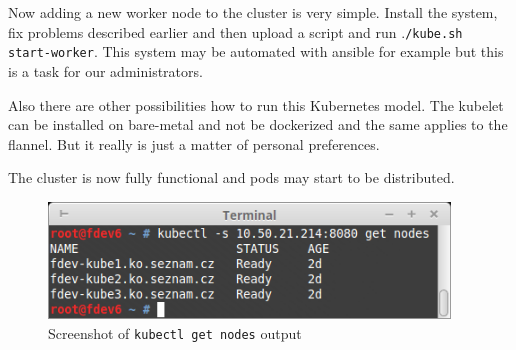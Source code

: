 Now adding a new worker node to the cluster is very simple. Install the system, fix problems described earlier and then upload a script and run .\lstinline{/kube.sh start-worker}. This system may be automated with ansible \cite{ansible} for example but this is a task for our administrators.

Also there are other possibilities how to run this Kubernetes model. The kubelet can be installed on bare-metal and not be dockerized and the same applies to the flannel. But it really is just a matter of personal preferences.

The cluster is now fully functional and pods may start to be distributed.

\begin{figure}[htb]\centering
  \includegraphics[width=0.95\textwidth]{images/kubectl_get_nodes.png}
  \caption
    {Screenshot of \lstinline{kubectl get nodes} output}
  \label{fig:kubectl-get-nodes}
\end{figure}

